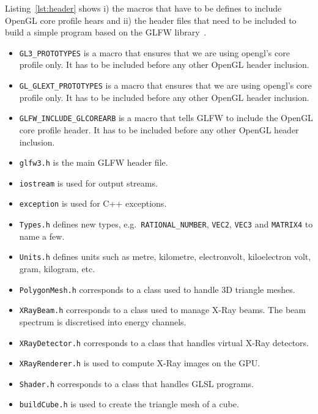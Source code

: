 \documentclass[11pt,oneside,a4paper,final]{article}
\begin{document}


Listing~\ref{lst:header} shows i) the macros that have to be defines to include OpenGL core profile hears and ii) the header files that need to be included to build a simple program based on the GLFW library~\cite{GLFW}. 
\begin{itemize}
 \item \verb+GL3_PROTOTYPES+ is a macro that ensures that we are using opengl's core profile only. It has to be included before any other OpenGL header inclusion.
 \item \verb+GL_GLEXT_PROTOTYPES+ is a macro that ensures that we are using opengl's core profile only. It has to be included before any other OpenGL header inclusion.
 \item \verb+GLFW_INCLUDE_GLCOREARB+ is a macro that tells GLFW to include the OpenGL core profile header. It has to be included before any other OpenGL header inclusion.
 \item \verb+glfw3.h+ is the main GLFW header file.
 \item \verb+iostream+ is used for output streams.
 \item \verb+exception+ is used for C++ exceptions.
 \item \verb+Types.h+ defines new types, e.g.~\verb+RATIONAL_NUMBER+, \verb+VEC2+, \verb+VEC3+ and \verb+MATRIX4+ to name a few.
 \item \verb+Units.h+ defines units such as metre, kilometre, electronvolt, kiloelectron volt, gram, kilogram, etc.
 \item \verb+PolygonMesh.h+ corresponds to a class used to handle \Acrshort{3D} triangle meshes.
 \item \verb+XRayBeam.h+ corresponds to a class used to manage X-Ray beams. The beam spectrum is discretised into energy channels.
 \item \verb+XRayDetector.h+ corresponds to a class that handles virtual X-Ray detectors.
 \item \verb+XRayRenderer.h+ is used to compute X-Ray images on the \Gls{GPU}.
 \item \verb+Shader.h+ corresponds to a class that handles \Gls{GLSL} programs.
 \item \verb+buildCube.h+ is used to create the triangle mesh of a cube.
\end{itemize}
\end{document}
